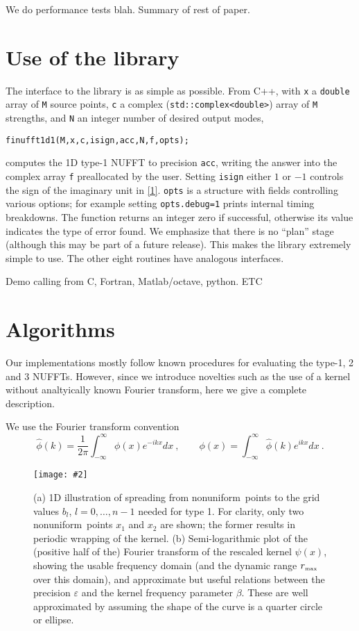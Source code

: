 \documentclass[10pt]{article}
\newcommand{\be}{\begin{equation}}
\newcommand{\ee}{\end{equation}}
\newcommand{\bfi}{\begin{figure}}
\newcommand{\efi}{\end{figure}}
\newcommand{\ca}[2]{\caption{#1 \label{#2}}}
\newcommand{\ig}[2]{\texttt{[image: \#2]}}
\newcommand{\tbox}[1]{{\mbox{\tiny #1}}}
\newcommand{\eps}{\varepsilon}
\newcommand{\intR}{\int_{-\infty}^\infty}
\newcommand{\NU}{{nonuniform}}
\newcommand{\rmax}{r_\tbox{max}}    %
\begin{document}
We do performance tests blah.
Summary of rest of paper.


\section{Use of the library}

The interface to the library is as
simple as possible.
From C++, with {\tt x} a {\tt double} array of {\tt M} source points,
{\tt c} a complex ({\tt std::complex<double>}) array of {\tt M} strengths,
and {\tt N} an integer number of desired output modes,
\begin{verbatim}
finufft1d1(M,x,c,isign,acc,N,f,opts);
\end{verbatim}
computes the 1D type-1 NUFFT to precision {\tt acc}, writing the
answer into the complex array {\tt f} preallocated by the user.
Setting {\tt isign} either $1$ or $-1$ controls the
sign of the imaginary unit in \eqref{1}.
{\tt opts} is a structure with fields controlling various options;
for example setting {\tt opts.debug=1} prints internal timing breakdowns.
The function returns an integer zero if successful, otherwise
its value indicates the type of error found.
We emphasize that there is no ``plan'' stage
(although this may be part of a future release).
This makes the library extremely simple to use.
The other eight routines have analogous interfaces.


Demo calling from C, Fortran, Matlab/octave, python.
ETC


\section{Algorithms}

Our implementations mostly follow known procedures
for evaluating the type-1, 2 and 3 NUFFTs.
However, since we introduce novelties such as the
use of a kernel without analtyically known Fourier transform,
here we give a complete description.

We use the Fourier transform convention
\be
\hat\phi(k) = \frac{1}{2\pi} \intR \phi(x) e^{-ikx} dx
~,\qquad
\phi(x) = \intR \hat\phi(k) e^{ikx} dx
~.
\label{ft}
\ee


\bfi[t]  %
\ig{width=6.5in}{spreadalias.eps}
\ca{(a) 1D illustration of spreading from \NU\ points to the grid
  values $b_l$, $l=0,\dots,n-1$ needed for type 1.
  For clarity, only two \NU\ points $x_1$ and $x_2$ are shown;
  the former results in periodic wrapping of the kernel.
  (b) Semi-logarithmic plot of the (positive half of the)
  Fourier transform of the rescaled
  kernel $\psi(x)$, showing the usable frequency domain (and the
  dynamic range $\rmax$ over this domain), and approximate
  but useful relations between the precision $\eps$
  and the kernel frequency parameter $\beta$.
  These are well approximated by assuming the shape of the curve is
  a quarter circle or ellipse.
}{f:spreadalias}
\efi
\end{document}
